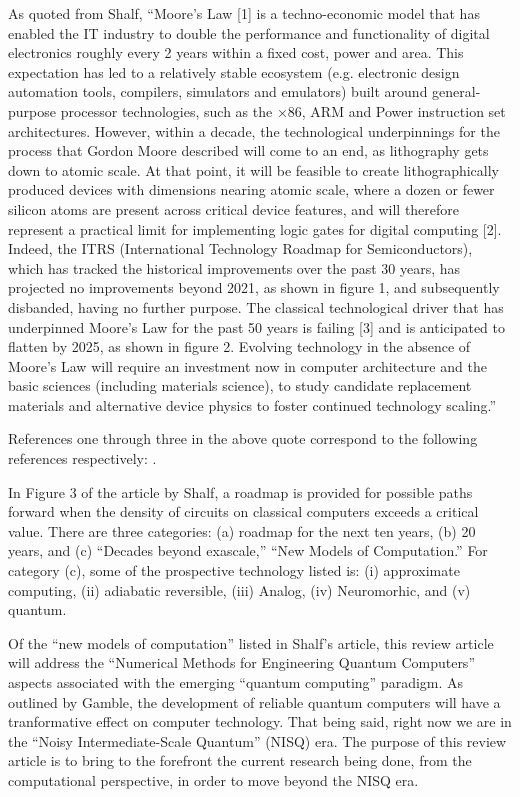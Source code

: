 \documentclass[]{article}
\begin{document}
As quoted from Shalf\cite{shalf2020future},
``Moore’s Law [1] is a techno-economic model that has enabled the IT industry to double the performance and functionality of digital electronics roughly every 2 years within a fixed cost, power and area. This expectation has led to a relatively stable ecosystem (e.g. electronic design automation tools, compilers, simulators and emulators) built around general-purpose processor technologies, such as the ×86, ARM and Power instruction set architectures. However, within a decade, the technological underpinnings for the process that Gordon Moore described will come to an end, as lithography gets down to atomic scale. At that point, it will be feasible to create lithographically produced devices with dimensions nearing atomic scale, where a dozen or fewer silicon atoms are present across critical device features, and will therefore represent a practical limit for implementing logic gates for digital computing [2]. Indeed, the ITRS (International Technology Roadmap for Semiconductors), which has tracked the historical improvements over the past 30 years, has projected no improvements beyond 2021, as shown in figure 1, and subsequently disbanded, having no further purpose. The classical technological driver that has underpinned Moore’s Law for the past 50 years is failing [3] and is anticipated to flatten by 2025, as shown in figure 2. Evolving technology in the absence of Moore’s Law will require an investment now in computer architecture and the basic sciences (including materials science), to study candidate replacement materials and alternative device physics to foster continued technology scaling.'' 
\par\noindent
References one through three in the above quote 
correspond to the following references respectively: 
\cite{moore2021cramming}\cite{mack2015multiple}\cite{markov2014limits}.
\par\noindent
In Figure 3 of the article by Shalf\cite{shalf2020future}, a roadmap is provided for possible paths forward when the density of circuits on classical computers exceeds a critical value.  There are three categories: (a) roadmap for the next ten years, (b) 20 years, and (c) ``Decades beyond exascale,'' ``New Models of Computation.'' For category (c), some of the prospective technology listed is:
(i) approximate computing, (ii) adiabatic reversible, (iii) Analog, (iv) Neuromorhic, and (v) quantum.
\par\noindent
Of the ``new models of computation'' listed in 
Shalf's article\cite{shalf2020future}, this review article will address
the ``Numerical Methods for Engineering Quantum Computers'' aspects associated with the emerging ``quantum computing'' paradigm.  As outlined by
Gamble\cite{gamble2019quantum}, the development of reliable quantum
computers will have a tranformative effect on computer technology.  That being said, right now we are in the ``Noisy Intermediate-Scale Quantum''\cite{callison2022hybrid} (NISQ) era.  The purpose of this review article is to bring to the forefront the current research being done, from the computational perspective, in order to move beyond the NISQ era.
\end{document}

